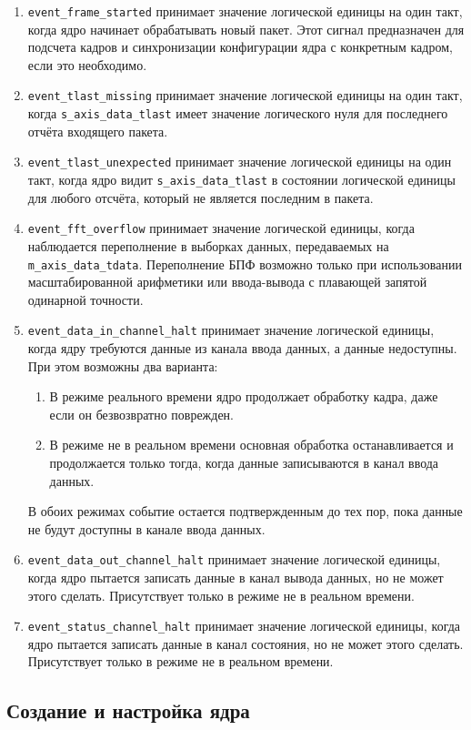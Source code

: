 \begin{enumerate}
	\item \verb|event_frame_started| принимает значение логической единицы на один такт, когда ядро начинает обрабатывать новый пакет. Этот сигнал предназначен для подсчета кадров и синхронизации конфигурации ядра с конкретным кадром, если это необходимо.
	\item \verb|event_tlast_missing| принимает значение логической единицы на один такт, когда \verb|s_axis_data_tlast| имеет значение логического нуля для последнего отчёта входящего пакета.
	\item \verb|event_tlast_unexpected| принимает значение логической единицы на один такт, когда ядро видит \verb|s_axis_data_tlast| в состоянии логической единицы для любого отсчёта, который не является последним в пакета. 
	\item \verb|event_fft_overflow|  принимает значение логической единицы, когда наблюдается переполнение в выборках данных, передаваемых на \verb|m_axis_data_tdata|. Переполнение БПФ возможно только при использовании масштабированной арифметики или ввода-вывода с плавающей запятой одинарной точности.
	\item \verb|event_data_in_channel_halt| принимает значение логической единицы, когда ядру требуются данные из канала ввода данных, а данные недоступны. При этом возможны два варианта:
	\begin{enumerate}
		\item В режиме реального времени ядро продолжает обработку кадра, даже если он безвозвратно поврежден.
		\item В режиме не в реальном времени основная обработка останавливается и продолжается только тогда, когда данные записываются в канал ввода данных.
	\end{enumerate}
	В обоих режимах событие остается подтвержденным до тех пор, пока данные не будут доступны в канале ввода данных.
	\item \verb|event_data_out_channel_halt| принимает значение логической единицы, когда ядро пытается записать данные в канал вывода данных, но не может этого сделать. Присутствует только в режиме не в реальном времени.
	\item \verb|event_status_channel_halt| принимает значение логической единицы, когда ядро пытается записать данные в канал состояния, но не может этого сделать. Присутствует только в режиме не в реальном времени. 
\end{enumerate}

\subsection{Создание и настройка ядра}

